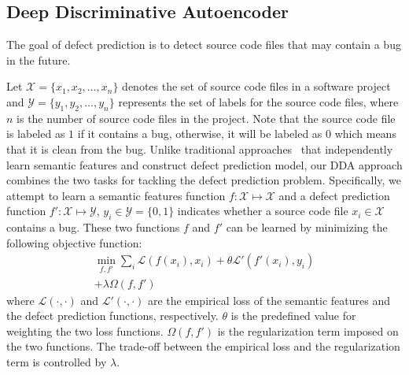 \subsection{Deep Discriminative Autoencoder}
\label{sec:semi}
The goal of defect prediction is to detect source code files that may contain a bug in the future. 

Let $\mathcal{X}=\{x_1, x_2, \dots, x_n\}$ denotes the set of source code files in a software project and $\mathcal{Y}=\{y_1, y_2, \dots, y_n\}$ represents the set of labels for the source code files, where $n$ is the number of source code files in the project.  Note that the source code file is labeled as $1$ if it contains a bug, otherwise, it will be labeled as $0$ which means that it is clean from the bug. %
Unlike traditional approaches~\cite{yang2015deep, wang2016automatically} that independently learn semantic features and construct defect prediction model, our DDA approach combines the two tasks for tackling the defect prediction problem. Specifically, we attempt to learn a semantic features function $f: \mathcal{X} \longmapsto \mathcal{X}$ and a defect prediction function $f': \mathcal{X} \longmapsto \mathcal{Y}$, $y_i \in \mathcal{Y}=\{0, 1\}$ indicates whether a source code file $x_i \in \mathcal{X}$ contains a bug. %
These two functions $f$ and $f'$ can be learned by minimizing the following objective function:
\begin{equation}
\label{eq:loss}
\begin{split}
\min_{f,f'} \sum_{i}^{}\mathcal{L}(f(x_i), x_i) + \theta \mathcal{L'}(f'(x_i), y_i) \\
+ \lambda \Omega(f, f')
\end{split}
\end{equation}
where $\mathcal{L}(\cdot, \cdot)$ and $\mathcal{L}'(\cdot, \cdot)$ are the empirical loss of the semantic features and the defect prediction functions, respectively. $\theta$ is the predefined value for weighting the two loss functions. $\Omega(f, f')$ is the regularization term imposed on the two functions. The trade-off between the empirical loss and the regularization term is controlled by $\lambda$. 

